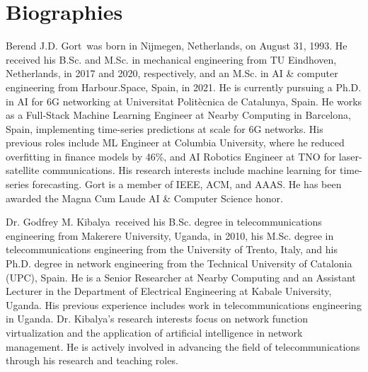 
\section*{Biographies}

\begin{IEEEbiography}
{Berend J.D. Gort}~was born in Nijmegen, Netherlands, on August 31, 1993. He received his B.Sc. and M.Sc. in mechanical engineering from TU Eindhoven, Netherlands, in 2017 and 2020, respectively, and an M.Sc. in AI \& computer engineering from Harbour.Space, Spain, in 2021. He is currently pursuing a Ph.D. in AI for 6G networking at Universitat Politècnica de Catalunya, Spain. He works as a Full-Stack Machine Learning Engineer at Nearby Computing in Barcelona, Spain, implementing time-series predictions at scale for 6G networks. His previous roles include ML Engineer at Columbia University, where he reduced overfitting in finance models by 46\%, and AI Robotics Engineer at TNO for laser-satellite communications. His research interests include machine learning for time-series forecasting. Gort is a member of IEEE, ACM, and AAAS. He has been awarded the Magna Cum Laude AI \& Computer Science honor.
\end{IEEEbiography}%


\begin{IEEEbiography}
{Dr. Godfrey M. Kibalya}~received his B.Sc. degree in telecommunications engineering from Makerere University, Uganda, in 2010, his M.Sc. degree in telecommunications engineering from the University of Trento, Italy, and his Ph.D. degree in network engineering from the Technical University of Catalonia (UPC), Spain. He is a Senior Researcher at Nearby Computing and an Assistant Lecturer in the Department of Electrical Engineering at Kabale University, Uganda. His previous experience includes work in telecommunications engineering in Uganda. Dr. Kibalya's research interests focus on network function virtualization and the application of artificial intelligence in network management. He is actively involved in advancing the field of telecommunications through his research and teaching roles.
\end{IEEEbiography}%

